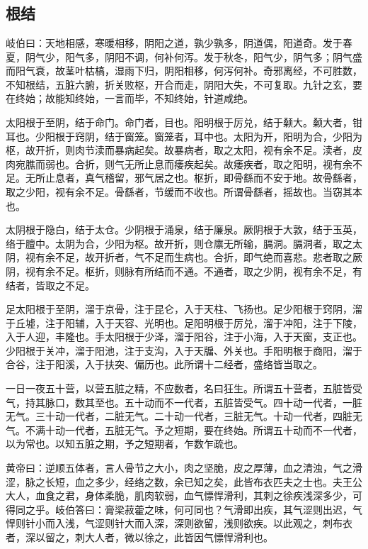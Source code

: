\documentclass[a4paper,12pt,UTF8,twoside]{ctexbook}
\begin{document}
	\part{}
	\chapter{根结}
	
	岐伯曰：天地相感，寒暖相移，阴阳之道，孰少孰多，阴道偶，阳道奇。发于春夏，阴气少，阳气多，阴阳不调，何补何泻。发于秋冬，阳气少，阴气多；阴气盛而阳气衰，故茎叶枯槁，湿雨下归，阴阳相移，何泻何补。奇邪离经，不可胜数，不知根结，五脏六腑，折关败枢，开合而走，阴阳大失，不可复取。九针之玄，要在终始；故能知终始，一言而毕，不知终始，针道咸绝。
	
	太阳根于至阴，结于命门。命门者，目也。阳明根于厉兑，结于颡大。颡大者，钳耳也。少阳根于窍阴，结于窗笼。窗笼者，耳中也。太阳为开，阳明为合，少阳为枢，故开折，则肉节渎而暴病起矣。故暴病者，取之太阳，视有余不足。渎者，皮肉宛膲而弱也。合折，则气无所止息而痿疾起矣。故痿疾者，取之阳明，视有余不足。无所止息者，真气稽留，邪气居之也。枢折，即骨繇而不安于地。故骨繇者，取之少阳，视有余不足。骨繇者，节缓而不收也。所谓骨繇者，摇故也。当窃其本也。
	
	太阴根于隐白，结于太仓。少阴根于涌泉，结于廉泉。厥阴根于大敦，结于玉英，络于膻中。太阴为合，少阳为枢。故开折，则仓廪无所输，膈洞。膈洞者，取之太阴，视有余不足，故开折者，气不足而生病也。合折，即气绝而喜悲。悲者取之厥阴，视有余不足。枢折，则脉有所结而不通。不通者，取之少阴，视有余不足，有结者，皆取之不足。
	
	足太阳根于至阴，溜于京骨，注于昆仑，入于天柱、飞扬也。足少阳根于窍阴，溜于丘墟，注于阳辅，入于天容、光明也。足阳明根于厉兑，溜于冲阳，注于下陵，入于人迎，丰隆也。手太阳根于少泽，溜于阳谷，注于小海，入于天窗，支正也。少阳根于关冲，溜于阳池，注于支沟，入于天牖、外关也。手阳明根于商阳，溜于合谷，注于阳溪，入于扶突、偏历也。此所谓十二经者，盛络皆当取之。
	
	一日一夜五十营，以营五脏之精，不应数者，名曰狂生。所谓五十营者，五脏皆受气，持其脉口，数其至也。五十动而不一代者，五脏皆受气。四十动一代者，一脏无气。三十动一代者，二脏无气。二十动一代者，三脏无气。十动一代者，四脏无气。不满十动一代者，五脏无气。予之短期，要在终始。所谓五十动而不一代者，以为常也。以知五脏之期，予之短期者，乍数乍疏也。
	
	黄帝曰：逆顺五体者，言人骨节之大小，肉之坚脆，皮之厚薄，血之清浊，气之滑涩，脉之长短，血之多少，经络之数，余已知之矣，此皆布衣匹夫之士也。夫王公大人，血食之君，身体柔脆，肌肉软弱，血气慓悍滑利，其刺之徐疾浅深多少，可得同之乎。岐伯答曰：膏梁菽藿之味，何可同也？气滑即出疾，其气涩则出迟，气悍则针小而入浅，气涩则针大而入深，深则欲留，浅则欲疾。以此观之，刺布衣者，深以留之，刺大人者，微以徐之，此皆因气慓悍滑利也。
	
\end{document}

